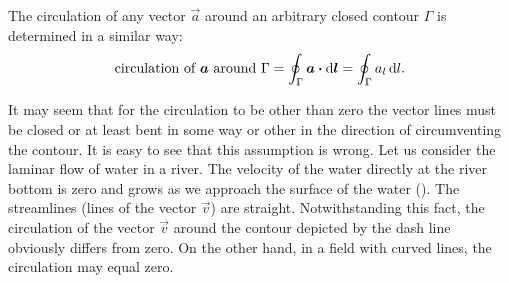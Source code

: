 \noindent
The circulation of any vector $\vec{a}$ around an arbitrary closed contour $\Gamma$ is determined in a similar way:
\begin{equation}\label{eq:1_83}
	\text{circulation of $\boldsymbol{a}$ around $\Gamma$} = \oint_{\Gamma} \boldsymbol{a} \boldsymbol{\cdot} \mathrm{d}\boldsymbol{l} = \oint_{\Gamma} a_l\,\mathrm{d} l.
\end{equation}

It may seem that for the circulation to be other than zero the vector lines must be closed or at least bent in some way or other in the direction of circumventing the contour. It is easy to see that this assumption is wrong. Let us consider the laminar flow of water in a river. The velocity of the water directly at the river bottom is zero and grows as we approach the surface of the water (). The streamlines (lines of the vector $\vec{v}$) are straight. Notwithstanding this fact, the circulation of the vector $\vec{v}$ around the contour depicted by the dash line obviously differs from zero. On the other hand, in a field with curved lines, the circulation may equal zero.

